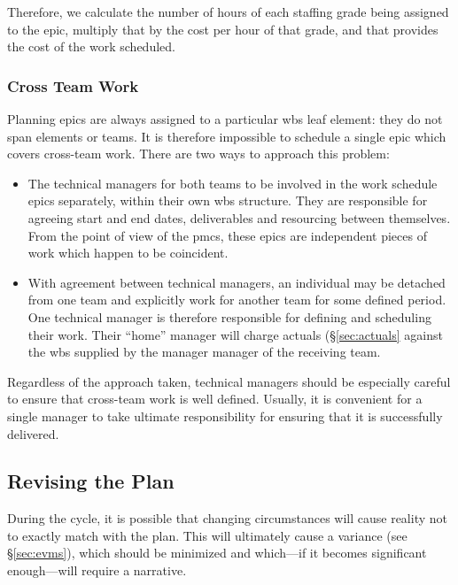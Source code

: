 Therefore, we calculate the number of hours of each staffing grade being
assigned to the \gls{epic}, multiply that by the cost per hour of that grade,
and that provides the cost of the work scheduled.

\subsubsection{Cross Team Work}
\label{sec:cross-team}

Planning \glspl{epic} are always assigned to a particular \gls{wbs} leaf \gls{element}: they do not span \glspl{element} or teams.
It is therefore impossible to schedule a single \gls{epic} which covers cross-team work.
There are two ways to approach this problem:

\begin{itemize}
\item
  The technical managers for both teams to be involved in the work schedule \glspl{epic} separately, within their own \gls{wbs} structure.
  They are responsible for agreeing start and end dates, deliverables and resourcing between themselves.
  From the point of view of the \gls{pmcs}, these \glspl{epic} are independent pieces of work which happen to be
  coincident.
\item
  With agreement between technical managers, an individual may be
  detached from one team and explicitly work for another team for some
  defined period. One technical manager is therefore responsible for
  defining and scheduling their work. Their ``home'' manager will charge
  actuals (\S\ref{sec:actuals} against the \gls{wbs} supplied
  by the manager manager of the receiving team.
\end{itemize}

Regardless of the approach taken, technical managers should be
especially careful to ensure that cross-team work is well defined.
Usually, it is convenient for a single manager to take ultimate
responsibility for ensuring that it is successfully delivered.

\subsection{Revising the Plan}
\label{sec:cycle-change}

During the \gls{cycle}, it is possible that changing circumstances will cause reality not to exactly match with the plan.
This will ultimately cause a variance (see \S\ref{sec:evms}), which should be minimized and which---if it becomes significant enough---will require a narrative.

